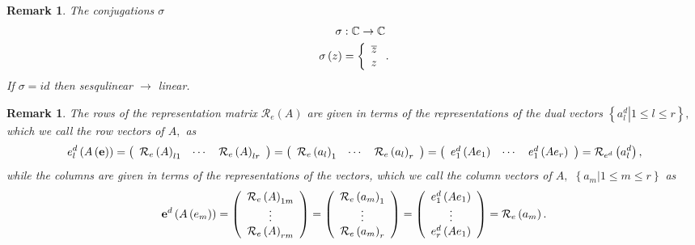 \documentclass[aps,preprint]{revtex4}%
\newtheorem{remark}[theorem]{Remark}
\begin{document}
\begin{remark}
The conjugations $\sigma$
\begin{align}
\sigma &  :\mathbb{C\rightarrow C}\\
\sigma\left(  z\right)   &  =\left\{
\begin{array}
[c]{c}%
\overline{z}\\
z
\end{array}
\right.  .
\end{align}
If $\sigma=id$ then sesqulinear $\rightarrow$ linear.
\end{remark}

\begin{remark}
The rows of the representation matrix $\mathcal{R}_{e}\left(  A\right)  $ are
given in terms of the representations of the dual vectors $\left\{  \left.
a_{l}^{d}\right\vert 1\leq l\leq r\right\}  ,$ which we call the \emph{row
vectors} of $A,$ as
\begin{equation}
e_{l}^{d}\left(  A\left(  \mathbf{e}\right)  \right)  =\left(
\begin{array}
[c]{ccc}%
\mathcal{R}_{e}\left(  A\right)  _{l1} & \cdots & \mathcal{R}_{e}\left(
A\right)  _{lr}%
\end{array}
\right)  =\left(
\begin{array}
[c]{ccc}%
\mathcal{R}_{e}\left(  a_{l}\right)  _{1} & \cdots & \mathcal{R}_{e}\left(
a_{l}\right)  _{r}%
\end{array}
\right)  =\left(
\begin{array}
[c]{ccc}%
e_{1}^{d}\left(  Ae_{1}\right)  & \cdots & e_{1}^{d}\left(  Ae_{r}\right)
\end{array}
\right)  =\mathcal{R}_{e^{d}}\left(  a_{l}^{d}\right)  ,
\end{equation}
while the columns are given in terms of the representations of the vectors,
which we call the \emph{column vectors} of $A,$ $\left\{  \left.
a_{m}\right\vert 1\leq m\leq r\right\}  $ as
\begin{equation}
\mathbf{e}^{d}\left(  A\left(  e_{m}\right)  \right)  =\left(
\begin{array}
[c]{c}%
\mathcal{R}_{e}\left(  A\right)  _{1m}\\
\vdots\\
\mathcal{R}_{e}\left(  A\right)  _{rm}%
\end{array}
\right)  =\left(
\begin{array}
[c]{c}%
\mathcal{R}_{e}\left(  a_{m}\right)  _{1}\\
\vdots\\
\mathcal{R}_{e}\left(  a_{m}\right)  _{r}%
\end{array}
\right)  =\left(
\begin{array}
[c]{c}%
e_{1}^{d}\left(  Ae_{1}\right) \\
\vdots\\
e_{r}^{d}\left(  Ae_{1}\right)
\end{array}
\right)  =\mathcal{R}_{e}\left(  a_{m}\right)  .
\end{equation}

\end{remark}
\end{document}
